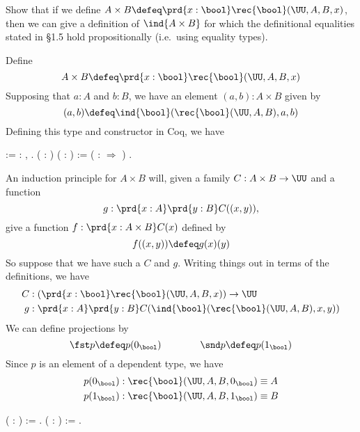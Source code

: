 Show that if we define $A \times B \defeq \prd{x : \bool}
\rec{\bool}(\UU, A, B, x)$, then we can give a definition of $\ind{A \times
  B}$ for which the definitional equalities stated in \S1.5 hold
propositionally (i.e.~using equality types). \begin{coqdoccode}
\coqdocemptyline
\end{coqdoccode}
\soln 
Define
\[
  A \times B \defeq \prd{x : \bool} \rec{\bool}(\UU, A, B, x)
\]
Supposing that $a : A$ and $b : B$, we have an element $(a, b) : A \times B$
given by
\[
  (a, b) \defeq \ind{\bool}(\rec{\bool}(\UU, A, B), a, b)
\]
Defining this type and constructor in Coq, we have \begin{coqdoccode}
\coqdocemptyline
\coqdocindent{1.00em}
  := \coqdockw{\ensuremath{\forall}}  : ,      .\coqdoceol
\coqdocemptyline
\coqdocindent{1.00em}
  ( : ) ( : ) :=  (  :  \ensuremath{\Rightarrow}      )  .\coqdoceol
\coqdocemptyline
\end{coqdoccode}


An induction principle for $A \times B$ will, given a family $C : A \times B
\to \UU$ and a function 
\[
  g : \prd{x:A}\prd{y:B} C((x, y)),
\] 
give a function $f : \prd{x : A \times B}C(x)$ defined by
\[
  f((x, y)) \defeq g(x)(y)
\]
So suppose that we have such a $C$ and $g$.  Writing things out in terms of the
definitions, we have
\begin{align*}
  C &: \left(\prd{x:\bool}\rec{\bool}(\UU, A, B, x)\right) \to \UU \\
  g &: \prd{x:A}\prd{y:B} C(\ind{\bool}(\rec{\bool}(\UU, A, B), x, y))
\end{align*}  
We can define projections by
\[
  \fst p \defeq p(0_{\bool}) \qquad\qquad \snd p \defeq p(1_{\bool})
\]
Since $p$ is an element of a dependent type, we have
\begin{align*}
  p(0_{\bool}) &: \rec{\bool}(\UU, A, B, 0_{\bool}) \equiv A\\
  p(1_{\bool}) &: \rec{\bool}(\UU, A, B, 1_{\bool}) \equiv B
\end{align*} \begin{coqdoccode}
\coqdocemptyline
\coqdocindent{1.00em}
  ( : ) :=  .\coqdoceol
\coqdocemptyline
\coqdocindent{1.00em}
  ( : ) :=  .\coqdoceol
\coqdocemptyline
\end{coqdoccode}



